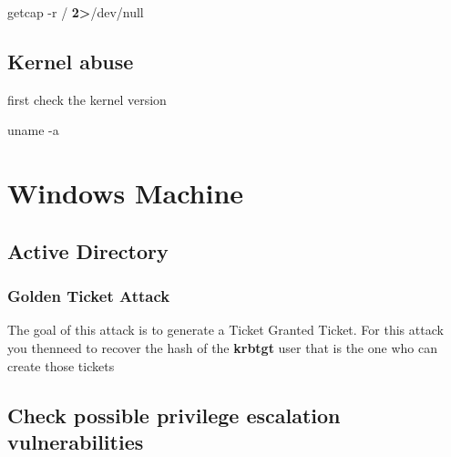 \documentclass{assets/ipesethesis}
\newenvironment{Shaded}{\begin{snugshade}}{\end{snugshade}}
\newcommand{\ExtensionTok}[1]{#1}
\newcommand{\FunctionTok}[1]{\textcolor[rgb]{0.00,0.00,0.00}{#1}}
\newcommand{\NormalTok}[1]{#1}
\newcommand{\OperatorTok}[1]{\textcolor[rgb]{0.81,0.36,0.00}{\textbf{#1}}}
\begin{document}
\begin{Shaded}
\begin{Highlighting}[]
\ExtensionTok{getcap}\NormalTok{ -r / }\OperatorTok{2>}\NormalTok{/dev/null}
\end{Highlighting}
\end{Shaded}

\hypertarget{kernel-abuse}{%
\section*{Kernel abuse}\label{kernel-abuse}}

first check the kernel version

\begin{Shaded}
\begin{Highlighting}[]
\FunctionTok{uname}\NormalTok{ -a}
\end{Highlighting}
\end{Shaded}

\hypertarget{windows-machine}{%
\chapter*{Windows Machine}\label{windows-machine}}

\hypertarget{active-directory}{%
\section*{Active Directory}\label{active-directory}}

\hypertarget{golden-ticket-attack}{%
\subsection*{Golden Ticket Attack}\label{golden-ticket-attack}}

The goal of this attack is to generate a Ticket Granted Ticket. For this attack you thenneed to recover the hash of the \textbf{krbtgt} user that is the one who
can create those tickets

\hypertarget{check-possible-privilege-escalation-vulnerabilities}{%
\section*{Check possible privilege escalation vulnerabilities}\label{check-possible-privilege-escalation-vulnerabilities}}
\end{document}
